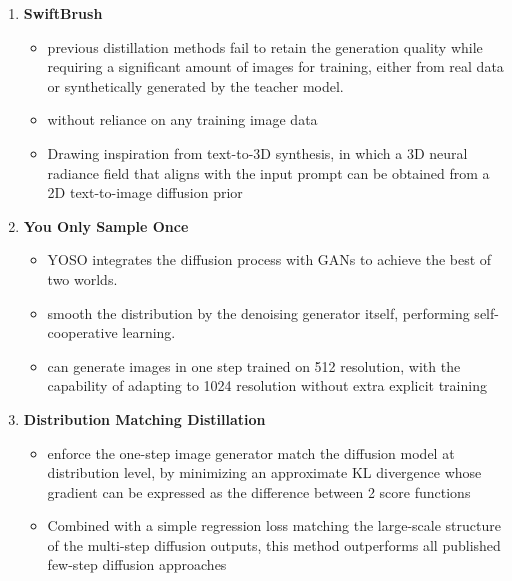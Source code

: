 \documentclass[11pt]{article}
\begin{document}
\begin{enumerate}
\item \textbf{SwiftBrush}\cite{nguyen2024swiftbrushonesteptexttoimagediffusion}
\begin{itemize}
    \item  previous distillation
methods fail to retain the generation quality while requiring a significant amount of images for training, either from
real data or synthetically generated by the teacher model.
\item without
reliance on any training image data
\item Drawing inspiration from text-to-3D synthesis, in which a 3D neural radiance field that aligns with the input prompt can be obtained
from a 2D text-to-image diffusion prior
\end{itemize}

\item \textbf{You Only Sample Once}\cite{luo2024sampleoncetamingonestep}
\begin{itemize}
    \item YOSO integrates the diffusion process with GANs to achieve the best of two worlds. 
    \item smooth the distribution by the denoising generator itself, performing self-cooperative learning.
    \item can generate images in one step trained on 512 resolution, with the capability of adapting to 1024 resolution without extra explicit training
\end{itemize}

\item \textbf{Distribution Matching Distillation}\cite{yin2023onestepdiffusiondistributionmatching}
\begin{itemize}
    \item enforce the one-step image generator match the diffusion model at distribution level, by minimizing an approximate KL divergence whose gradient can be expressed as the difference between 2 score functions
    \item Combined with a simple regression loss matching the large-scale structure of the multi-step diffusion outputs, this method outperforms all published few-step diffusion approaches
\end{itemize}


\end{enumerate}
\end{document}
